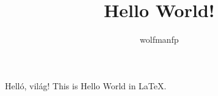 \documentclass[a4paper]{article}
\title{Hello World!}
\author{wolfmanfp}
\begin{document}
	\maketitle
	\center
	\huge
	Helló, világ!
	\flushleft
	\large
	This is Hello World in \LaTeX.
\end{document}
